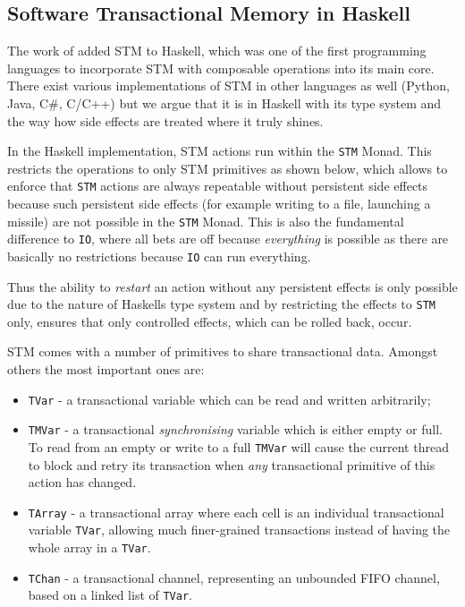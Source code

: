 \subsection{Software Transactional Memory in Haskell}
The work of \cite{harris_composable_2005, harris_transactional_2006} added STM to Haskell, which was one of the first programming languages to incorporate STM with composable operations into its main core. There exist various implementations of STM in other languages as well (Python, Java, C\#, C/C++) but we argue that it is in Haskell with its type system and the way how side effects are treated where it truly shines.

In the Haskell implementation, STM actions run within the \texttt{STM} Monad. This restricts the operations to only STM primitives as shown below, which allows to enforce that \texttt{STM} actions are always repeatable without persistent side effects because such persistent side effects (for example writing to a file, launching a missile) are not possible in the \texttt{STM} Monad. This is also the fundamental difference to \texttt{IO}, where all bets are off because \textit{everything} is possible as there are basically no restrictions because \texttt{IO} can run everything.

Thus the ability to \textit{restart} an action without any persistent effects is only possible due to the nature of Haskells type system and by restricting the effects to \texttt{STM} only, ensures that only controlled effects, which can be rolled back, occur.

STM comes with a number of primitives to share transactional data. Amongst others the most important ones are:

\begin{itemize}
	\item \texttt{TVar} - a transactional variable which can be read and written arbitrarily;
	\item \texttt{TMVar} - a transactional \textit{synchronising} variable which is either empty or full. To read from an empty or write to a full \texttt{TMVar} will cause the current thread to block and retry its transaction when \textit{any} transactional primitive of this action has changed.
	\item \texttt{TArray} - a transactional array where each cell is an individual transactional variable \texttt{TVar}, allowing much finer-grained transactions instead of having the whole array in a \texttt{TVar}.
	\item \texttt{TChan} - a transactional channel, representing an unbounded FIFO channel, based on a linked list of \texttt{TVar}.
\end{itemize}


